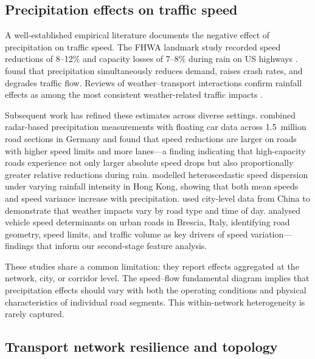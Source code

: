 \documentclass[review]{elsarticle}
\begin{document}
\subsection{Precipitation effects on traffic speed}
\label{sec:lit:precip}

A well-established empirical literature documents the negative effect of precipitation on traffic speed. The FHWA landmark study recorded speed reductions of 8--12\% and capacity losses of 7--8\% during rain on US highways \citep{hranac2006empirical}. \citet{maze2006weather} found that precipitation simultaneously reduces demand, raises crash rates, and degrades traffic flow. Reviews of weather--transport interactions confirm rainfall effects as among the most consistent weather-related traffic impacts \citep{koetse2009impact,elfaouzi2012effects}.

Subsequent work has refined these estimates across diverse settings. \citet{becker2026rainfall} combined radar-based precipitation measurements with floating car data across 1.5~million road sections in Germany and found that speed reductions are larger on roads with higher speed limits and more lanes---a finding indicating that high-capacity roads experience not only larger absolute speed drops but also proportionally greater relative reductions during rain. \citet{cai2016rainfall} modelled heteroscedastic speed dispersion under varying rainfall intensity in Hong Kong, showing that both mean speeds and speed variance increase with precipitation. \citet{bi2022weather} used city-level data from China to demonstrate that weather impacts vary by road type and time of day. \citet{raccagni2024urban} analysed vehicle speed determinants on urban roads in Brescia, Italy, identifying road geometry, speed limits, and traffic volume as key drivers of speed variation---findings that inform our second-stage feature analysis.

These studies share a common limitation: they report effects aggregated at the network, city, or corridor level. The speed--flow fundamental diagram \citep{greenshields1935study} implies that precipitation effects should vary with both the operating conditions and physical characteristics of individual road segments. This within-network heterogeneity is rarely captured.

\subsection{Transport network resilience and topology}
\label{sec:lit:resilience}
\end{document}
